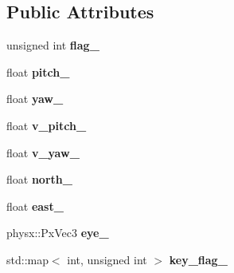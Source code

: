 \subsection*{Public Attributes}
\begin{DoxyCompactItemize}
\item 
\hypertarget{classneb_1_1camera_1_1camera_a9e2f60405bd7ac4f545196a16f49248f}{unsigned int {\bfseries flag\-\_\-}}\label{classneb_1_1camera_1_1camera_a9e2f60405bd7ac4f545196a16f49248f}

\item 
\hypertarget{classneb_1_1camera_1_1camera_a6961799cec174db6f09db93e4cd57514}{float {\bfseries pitch\-\_\-}}\label{classneb_1_1camera_1_1camera_a6961799cec174db6f09db93e4cd57514}

\item 
\hypertarget{classneb_1_1camera_1_1camera_a49fcdd4dfcac098554f1e70300597f45}{float {\bfseries yaw\-\_\-}}\label{classneb_1_1camera_1_1camera_a49fcdd4dfcac098554f1e70300597f45}

\item 
\hypertarget{classneb_1_1camera_1_1camera_a8b2bfee119dd3382c7b1c66d98de8c2d}{float {\bfseries v\-\_\-pitch\-\_\-}}\label{classneb_1_1camera_1_1camera_a8b2bfee119dd3382c7b1c66d98de8c2d}

\item 
\hypertarget{classneb_1_1camera_1_1camera_a597b1b95796731171e31dd16b2ce3ab7}{float {\bfseries v\-\_\-yaw\-\_\-}}\label{classneb_1_1camera_1_1camera_a597b1b95796731171e31dd16b2ce3ab7}

\item 
\hypertarget{classneb_1_1camera_1_1camera_a73b09ca879ff37ccaff0bd0727e4c5c0}{float {\bfseries north\-\_\-}}\label{classneb_1_1camera_1_1camera_a73b09ca879ff37ccaff0bd0727e4c5c0}

\item 
\hypertarget{classneb_1_1camera_1_1camera_a0b8c198df9a31cdb49bf40f8bbdac9f7}{float {\bfseries east\-\_\-}}\label{classneb_1_1camera_1_1camera_a0b8c198df9a31cdb49bf40f8bbdac9f7}

\item 
\hypertarget{classneb_1_1camera_1_1camera_a1bf63c02c19369185c8218328278bc7e}{physx\-::\-Px\-Vec3 {\bfseries eye\-\_\-}}\label{classneb_1_1camera_1_1camera_a1bf63c02c19369185c8218328278bc7e}

\item 
\hypertarget{classneb_1_1camera_1_1camera_a9003568b1eb646d97fbb05516352c438}{std\-::map$<$ int, unsigned int $>$ {\bfseries key\-\_\-flag\-\_\-}}\label{classneb_1_1camera_1_1camera_a9003568b1eb646d97fbb05516352c438}


\end{DoxyCompactItemize}
